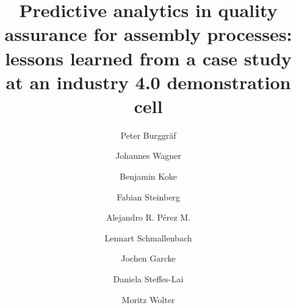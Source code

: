 \documentclass[5p,times,procedia]{elsarticle}
\begin{document}
\begin{frontmatter}



%

\title{Predictive analytics in quality assurance for assembly processes:
       lessons learned from a case study at an industry 4.0 demonstration cell}




\author[a]{Peter Burggräf}
\author[a]{Johannes Wagner}
\author[a]{Benjamin Koke}
\author[a]{Fabian Steinberg} 
\author[a]{Alejandro R. Pérez M.}
\author[a]{Lennart Schmallenbach}
\author[b,c]{Jochen Garcke}
\author[b]{Daniela Steffes-Lai}
\author[b,d]{Moritz Wolter}


\address[a]{Chair of International Production Engineering and Management (IPEM), Universität Siegen, Paul-Bonatz-Straße 9-11, Siegen - 57076, Germany}
\address[b]{Fraunhofer Institute for Algorithms and Scientific Computing (SCAI), Schloss Birlinghoven 1, Sankt Augustin- 53757, Germany}
\address[c]{Institut for Numerical Simulation, Universität Bonn, Endenicher Allee 19b, 53115 Bonn}
\address[d]{Institut for Computer Science, Universität Bonn, Endenicher Allee 19a, 53115 Bonn}



\end{frontmatter}
\end{document}
